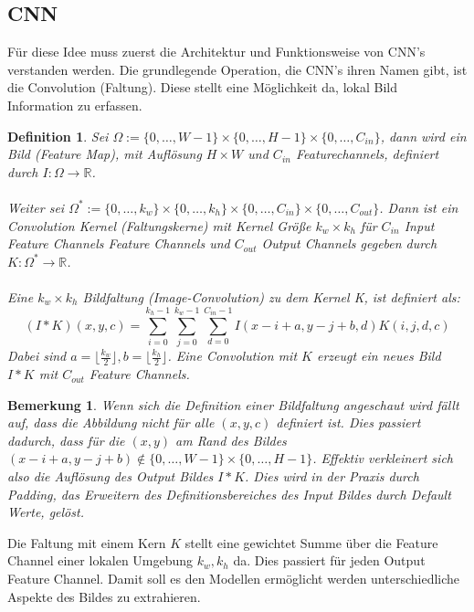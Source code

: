 \documentclass[12pt,DIV=15,BCOR=15mm,twoside,headsepline,abstract=true,listof=totoc,bibliography=totoc]{scrreprt}
\newtheorem{remark}{Bemerkung}[chapter]
\newtheorem{defi}{Definition}
\theoremstyle{remark}    %
\begin{document}
    \subsection{CNN}
    Für diese Idee muss zuerst die Architektur und Funktionsweise von CNN's verstanden werden. Die grundlegende Operation, die CNN's ihren Namen gibt, 
    ist die Convolution (Faltung). Diese stellt eine Möglichkeit da, lokal Bild Information zu erfassen.
    \begin{defi}
    Sei $\Omega := \{0, \ldots , W-1\} \times \{ 0, \ldots, H-1\} \times  \{ 0, \ldots,C_{in}\}$, dann wird ein Bild (Feature Map), mit Auflösung $H\times W$ 
    und $C_{in}$ Featurechannels, definiert durch $I: \Omega \to \mathbb{R}$.\\\\
    Weiter sei $\Omega^* := \{0, \ldots , k_w\} \times \{ 0, \ldots, k_h\} \times \{0, \ldots, C_{in} \} \times  \{0, \ldots,C_{out}\} $. Dann ist ein 
    Convolution Kernel (Faltungskerne) mit Kernel Größe $k_w  \times k_h$ für $C_{in}$ Input Feature Channels Feature Channels und $C_{out}$ Output 
    Channels gegeben durch $K: \Omega^* \to \mathbb{R}$.\\\\
    Eine $k_w\times k_h$ Bildfaltung (Image-Convolution) zu dem Kernel K, ist definiert als:  
    \[
    (I * K)(x, y, c) = \sum_{i =0}^{k_h-1}\sum_{j=0}^{k_w-1} \sum_{d = 0}^{C_{in}-1}I(x-i +a, y-j+b, d)K(i,j,d,c)
    \]
    Dabei sind $a = \lfloor \frac{k_w}{2} \rfloor, b = \lfloor \frac{k_h}{2} \rfloor$. Eine Convolution mit $K$ erzeugt ein neues Bild $I * K$ 
    mit $C_{out}$ Feature Channels.\cite{pytorch_Convolution}
    \end{defi} 
    \begin{remark}
    Wenn sich die Definition einer Bildfaltung angeschaut wird fällt auf, dass die Abbildung nicht für alle $(x,y,c)$ definiert ist.
    Dies passiert dadurch, dass für die $(x,y)$ am Rand des Bildes $(x-i+a,y-j+b) \notin  \{0, \ldots , W-1\} \times \{ 0, \ldots, H-1\}$.
    Effektiv verkleinert sich also die Auflösung des Output Bildes $I * K$. Dies wird in der Praxis durch Padding, das Erweitern des 
    Definitionsbereiches des Input Bildes durch Default Werte, gelöst. \cite{pytorch_Convolution}    
    \end{remark}\noindent
    Die Faltung mit einem Kern $K$ stellt eine gewichtet Summe über die Feature Channel einer lokalen Umgebung $k_w, k_h$ da. Dies passiert
    für jeden Output Feature Channel. Damit soll es den Modellen ermöglicht werden unterschiedliche Aspekte des Bildes zu extrahieren.\\\\
\end{document}
